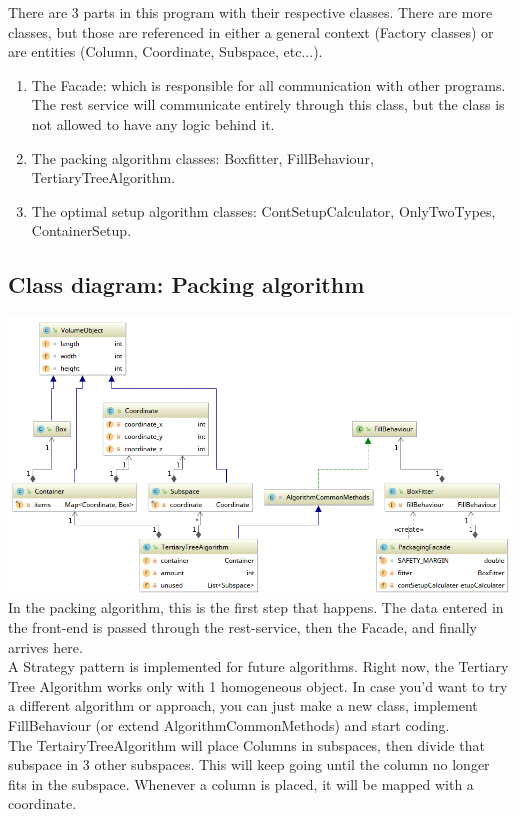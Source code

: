 \documentclass[a4paper,12pt]{article}
\begin{document}
There are 3 parts in this program with their respective classes. There are more classes, but those are referenced in either a general context (Factory classes) or are entities (Column, Coordinate, Subspace, etc...). 
\begin{enumerate}
	\item The Facade: which is responsible for all communication with other programs. The rest service will communicate entirely through this class, but the class is not allowed to have any logic behind it.
	\item The packing algorithm classes: Boxfitter, FillBehaviour, TertiaryTreeAlgorithm.
	\item The optimal setup algorithm classes: ContSetupCalculator, OnlyTwoTypes, ContainerSetup.
\end{enumerate}

\pagebreak

\subsection{Class diagram: Packing algorithm}
\includegraphics[width=17cm]{Class_diagram_packing_classes.png}\\
In the packing algorithm, this is the first step that happens. The data entered in the front-end is passed through the rest-service, then the Facade, and finally arrives here. \\

A Strategy pattern is implemented for future algorithms. Right now, the Tertiary Tree Algorithm works only with 1 homogeneous object. In case you'd want to try a different algorithm or approach, you can just make a new class, implement FillBehaviour (or extend AlgorithmCommonMethods) and start coding. \\

The TertairyTreeAlgorithm will place Columns in subspaces, then divide that subspace in 3 other subspaces. This will keep going until the column no longer fits in the subspace. Whenever a column is placed, it will be mapped with a coordinate. \\
\end{document}
